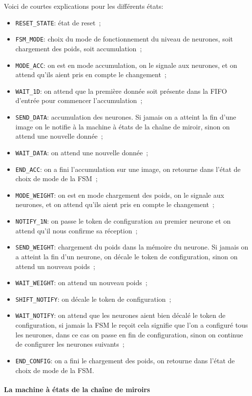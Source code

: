 Voici de courtes explications pour les différents états:
\begin{itemize}
	\item \verb+RESET_STATE+: état de reset~;
	\item \verb+FSM_MODE+: choix du mode de fonctionnement du niveau de
		neurones, soit chargement des poids, soit accumulation~;
	\item \verb+MODE_ACC+: on est en mode accumulation, on le signale aux
		neurones, et on attend qu'ils aient pris en compte le changement~;
	\item \verb+WAIT_1D+: on attend que la première donnée soit présente
		dans la FIFO d'entrée pour commencer l'accumulation~;
	\item \verb+SEND_DATA+: accumulation des neurones. Si jamais on a atteint
		la fin d'une image on le notifie à la machine à états de la
		chaîne de miroir, sinon on attend une nouvelle donnée~;
	\item \verb+WAIT_DATA+: on attend une nouvelle donnée~;
	\item \verb+END_ACC+: on a fini l'accumulation sur une image, on retourne
		dans l'état de choix de mode de la FSM~;
	\item \verb+MODE_WEIGHT+: on est en mode chargement des poids, on le signale aux
		neurones, et on attend qu'ils aient pris en compte le changement~;
	\item \verb+NOTIFY_1N+: on passe le token de configuration au premier neurone
		et on attend qu'il nous confirme sa réception~;
	\item \verb+SEND_WEIGHT+: chargement du poids dans la mémoire du neurone.
		Si jamais on a atteint la fin d'un neurone, on décale le token
		de configuration, sinon on attend un nouveau poids~;
	\item \verb+WAIT_WEIGHT+: on attend un nouveau poids~;
	\item \verb+SHIFT_NOTIFY+: on décale le token de configuration~;
	\item \verb+WAIT_NOTIFY+: on attend que les neurones aient bien décalé
		le token de configuration, si jamais la FSM le reçoit cela signifie
		que l'on a configuré tous les neurones, dans ce cas on passe en
		fin de configuration, sinon on continue de configurer les neurones suivants~;
	\item \verb+END_CONFIG+: on a fini le chargement des poids, on retourne
		dans l'état de choix de mode de la FSM.
\end{itemize}


\paragraph{La machine à états de la chaîne de miroirs\\}

